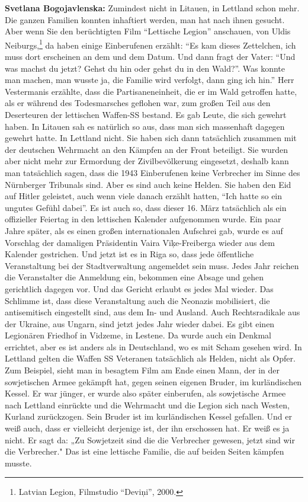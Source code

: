 \textbf{Svetlana Bogojavlenska:} Zumindest nicht in Litauen, in Lettland schon mehr. Die ganzen Familien konnten inhaftiert werden, man hat nach ihnen gesucht. Aber wenn Sie den berüchtigten Film "`Lettische Legion"' anschauen, von Uldis Neiburgs,\footnote{Latvian Legion, Filmstudio "`Deviņi"', 2000.} da haben einige Einberufenen erzählt: "`Es kam dieses Zettelchen, ich muss dort erscheinen an dem und dem Datum. Und dann fragt der Vater: "`Und was machst du jetzt? Gehst du hin oder gehst du in den Wald?"'. Was konnte man machen, man wusste ja, die Familie wird verfolgt, dann ging ich hin."' Herr Vestermanis erzählte, dass die Partisaneneinheit, die er im Wald getroffen hatte, als er während des Todesmarsches geflohen war, zum großen Teil aus den Deserteuren der lettischen Waffen-SS bestand. Es gab Leute, die sich gewehrt haben. In Litauen sah es natürlich so aus, dass man sich massenhaft dagegen gewehrt hatte. In Lettland nicht. Sie haben sich dann tatsächlich zusammen mit der deutschen Wehrmacht an den Kämpfen an der Front beteiligt. Sie wurden aber nicht mehr zur Ermordung der Zivilbevölkerung eingesetzt, deshalb kann man tatsächlich sagen, dass die 1943 Einberufenen keine Verbrecher im Sinne des Nürnberger Tribunals sind. Aber es sind auch keine Helden. Sie haben den Eid auf Hitler geleistet, auch wenn viele danach erzählt hatten, "`Ich hatte so ein ungutes Gefühl dabei"'. Es ist auch so, dass dieser 16. März tatsächlich als ein offizieller Feiertag in den lettischen Kalender aufgenommen wurde. Ein paar Jahre später, als es einen großen internationalen Aufschrei gab, wurde es auf Vorschlag der damaligen Präsidentin Vaira Vīķe-Freiberga wieder aus dem Kalender gestrichen. Und jetzt ist es in Riga so, dass jede öffentliche Veranstaltung bei der Stadtverwaltung angemeldet sein muss. Jedes Jahr reichen die Veranstalter die Anmeldung ein, bekommen eine Absage und gehen gerichtlich dagegen vor. Und das Gericht erlaubt es jedes Mal wieder. Das Schlimme ist, dass diese Veranstaltung auch die Neonazis mobilisiert, die antisemitisch eingestellt sind, aus dem In- und Ausland. Auch Rechtsradikale aus der Ukraine, aus Ungarn, sind jetzt jedes Jahr wieder dabei.
Es gibt einen Legionären Friedhof in Vidzeme, in Lestene. Da wurde auch ein Denkmal errichtet, aber es ist anders als in Deutschland, wo es mit Scham gesehen wird. In Lettland gelten die Waffen SS Veteranen tatsächlich als Helden, nicht als Opfer. Zum Beispiel, sieht man in besagtem Film am Ende einen Mann, der in der sowjetischen Armee gekämpft hat, gegen seinen eigenen Bruder, im kurländischen Kessel. Er war jünger, er wurde also später einberufen, als sowjetische Armee nach Lettland einrückte und die Wehrmacht und die Legion sich nach Westen, Kurland zurückzogen. Sein Bruder ist im kurländischen Kessel gefallen. Und er weiß auch, dass er vielleicht derjenige ist, der ihn erschossen hat. Er weiß es ja nicht. Er sagt da: „Zu Sowjetzeit sind die die Verbrecher gewesen, jetzt sind wir die Verbrecher." Das ist eine lettische Familie, die auf beiden Seiten kämpfen musste.
